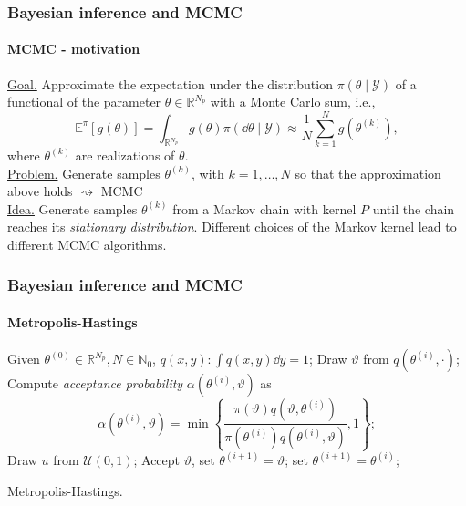 \documentclass{beamer}
\newcommand{\N}{\mathbb{N}}
\newcommand{\R}{\mathbb{R}}
\newcommand{\E}{\mathbb{E}}
\begin{document}
\begin{frame}
	\frametitle{Bayesian inference and MCMC}
	\framesubtitle{MCMC - motivation}
	
	\underline{Goal.} Approximate the expectation under the distribution $\pi(\theta \mid \mathcal{Y})$ of a functional of the parameter $\theta \in \R^{N_p}$ with a Monte Carlo sum, i.e.,
	\begin{equation*}\label{eq:MonteCarlo}
			 \E^\pi\left[g(\theta)\right] = \int_{\R^{N_p}} g(\theta)\pi(\dd\theta\mid\mathcal{Y})  \approx \frac{1}{N}\sum_{k = 1}^{N} g(\theta^{(k)}),
	\end{equation*}
	where $\theta^{(k)}$ are realizations of $\theta$. \\[0.5cm]
	\underline{Problem.} Generate samples $\theta^{(k)}$, with $k = 1, \ldots, N$ so that the approximation above holds
	$\rightsquigarrow$ MCMC \cite[e.g.]{Gil05} \\[0.5cm]
	\underline{Idea.} Generate samples $\theta^{(k)}$ from a Markov chain with kernel $P$ until the chain reaches its \textit{stationary distribution}. Different choices of the Markov kernel lead to different MCMC algorithms.	
\end{frame}

\begin{frame}
	\frametitle{Bayesian inference and MCMC}
	\framesubtitle{Metropolis-Hastings}
	\begin{algorithm}[H]	
		\begin{algorithmic}
			\STATE Given $\theta^{(0)} \in \R^{N_p}, N \in \N_0$, $q(x, y)\colon \int q(x,y)\dd y = 1$;
			\STATE Draw $\vartheta$ from $q(\theta^{(i)}, \cdot)$;
			\STATE Compute \textit{acceptance probability} $\alpha(\theta^{(i)}, \vartheta)$ as $$\alpha(\theta^{(i)}, \vartheta) = \min\left\{\frac{\pi(\vartheta)q(\vartheta, \theta^{(i)})}{\pi(\theta^{(i)})q(\theta^{(i)}, \vartheta)}, 1\right\};$$
			\STATE Draw $u$ from $\mathcal{U}(0, 1)$;
			\STATE Accept $\vartheta$, set $\theta^{(i+1)} = \vartheta$; 
			\ELSE
			\STATE set $\theta^{(i+1)} = \theta^{(i)}$;
			\ENDIF
			\ENDFOR
		\end{algorithmic}
		\caption{Metropolis-Hastings.}
	\end{algorithm}
\end{frame}
\end{document}
